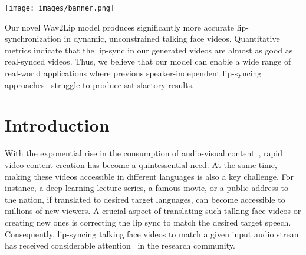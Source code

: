 \documentclass[sigconf]{acmart}
\begin{document}


\begin{teaserfigure}
 \texttt{[image: images/banner.png]}
 \caption{Our novel Wav2Lip model produces significantly more accurate lip-synchronization in dynamic, unconstrained talking face videos. Quantitative metrics indicate that the lip-sync in our generated videos are almost as good as real-synced videos. Thus, we believe that our model can enable a wide range of real-world applications where previous speaker-independent lip-syncing approaches~\cite{jamaludin2019you,kr2019towards} struggle to produce satisfactory results.}
 \label{fig:teaser}
\end{teaserfigure}

\maketitle

\section{Introduction}
With the exponential rise in the consumption of audio-visual content~\cite{videocalling}, rapid video content creation has become a quintessential need. At the same time, making these videos accessible in different languages is also a key challenge. For instance, a deep learning lecture series, a famous movie, or a public address to the nation, if translated to desired target languages, can become accessible to millions of new viewers. A crucial aspect of translating such talking face videos or creating new ones is correcting the lip sync to match the desired target speech. Consequently, lip-syncing talking face videos to match a given input audio stream has received considerable attention~\cite{jamaludin2019you,fried2019text,chen2019sound,thies2019neural,kr2019towards} in the research community. 
\end{document}
